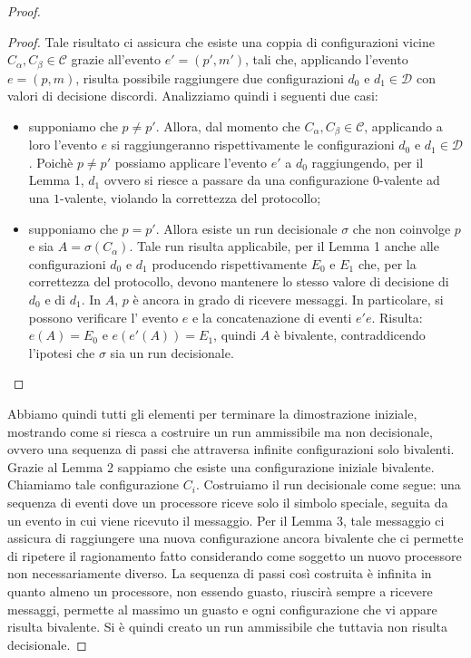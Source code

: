\documentclass{article}
\begin{document}
\begin{proof}
\begin{proof}
Tale risultato ci assicura che esiste una coppia di configurazioni
vicine $C_{\alpha}, C_{\beta} \in \mathcal{C}$ grazie all'evento
$e'=(p',m')$, tali che, applicando l'evento $e=(p,m)$, risulta
possibile raggiungere due configurazioni $d_0$ e $d_1 \in \mathcal{D}$
con valori di decisione discordi. Analizziamo quindi i seguenti due
casi:
\begin{itemize}
\item supponiamo che $p \neq p'$. Allora, dal momento che $C_{\alpha},
  C_{\beta} \in \mathcal{C}$, applicando a loro l'evento $e$ si
  raggiungeranno rispettivamente le configurazioni $d_0$ e $d_1 \in
  \mathcal{D}$. Poichè $p\neq p'$ possiamo applicare l'evento $e'$ a
  $d_0$ raggiungendo, per il Lemma 1, $d_1$ ovvero si riesce a passare
  da una configurazione $0$-valente ad una $1$-valente, violando la
  correttezza del protocollo;
\item supponiamo che $p=p'$. Allora esiste un run decisionale $\sigma$
  che non coinvolge $p$ e sia $A=\sigma(C_{\alpha})$. Tale run risulta
  applicabile, per il Lemma 1 anche alle configurazioni $d_0$ e $d_1$
  producendo rispettivamente $E_0$ e $E_1$ che, per la correttezza del
  protocollo, devono mantenere lo stesso valore di decisione di $d_0$
  e di $d_1$. In $A$, $p$ è ancora in grado di ricevere messaggi. In
  particolare, si possono verificare l' evento $e$ e la concatenazione
  di eventi $e'e$. Risulta: $e(A)=E_0$ e $e(e'(A))=E_1$, quindi $A$ è
  bivalente, contraddicendo l'ipotesi che $\sigma$ sia un run
  decisionale.
\end{itemize} 
\end{proof}
Abbiamo quindi tutti gli elementi per terminare la dimostrazione iniziale, mostrando come si riesca a costruire un run ammissibile ma non decisionale, ovvero una sequenza di passi che attraversa infinite configurazioni solo bivalenti. \\
Grazie al Lemma 2 sappiamo che esiste una configurazione iniziale bivalente. Chiamiamo tale configurazione $C_i$. Costruiamo il run decisionale come segue: una sequenza di eventi dove un processore riceve solo il simbolo speciale, seguita da un evento in cui viene ricevuto il messaggio.  Per il Lemma 3, tale messaggio ci assicura di raggiungere una nuova configurazione ancora bivalente che ci permette di ripetere il ragionamento fatto considerando come soggetto un nuovo processore non necessariamente diverso. La sequenza di passi così costruita è infinita in quanto almeno un processore, non essendo guasto, riuscirà sempre a ricevere messaggi, permette al massimo un guasto e ogni configurazione che vi appare risulta bivalente. Si è quindi creato un run ammissibile che tuttavia non risulta decisionale.    
\end{proof}
\end{document}
